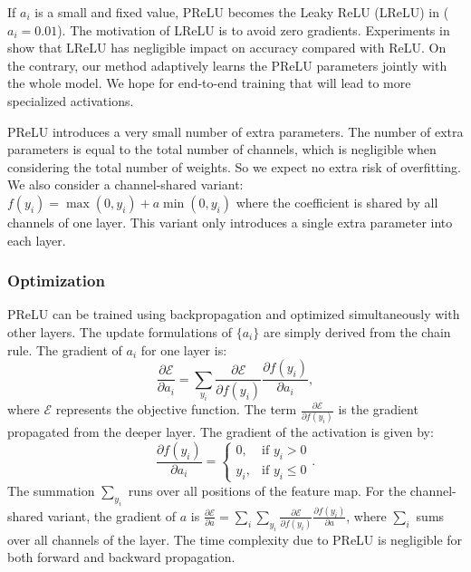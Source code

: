 \documentclass[10pt,twocolumn,letterpaper]{article}
\begin{document}
If $a_i$ is a small and fixed value, PReLU becomes the Leaky ReLU (LReLU) in \cite{Maas2013} ($a_i=0.01$). The motivation of LReLU is to avoid zero gradients. Experiments in \cite{Maas2013} show that LReLU has negligible impact on accuracy compared with ReLU. On the contrary, our method adaptively learns the PReLU parameters jointly with the whole model. We hope for end-to-end training that will lead to more specialized activations.

PReLU introduces a very small number of extra parameters. The number of extra parameters is equal to the total number of channels, which is negligible when considering the total number of weights. So we expect no extra risk of overfitting. We also consider a channel-shared variant: $f(y_i) = \max(0, y_i) + a \min(0, y_i)$ where the coefficient is shared by all channels of one layer. This variant only introduces a single extra parameter into each layer.

\subsubsection*{Optimization}

PReLU can be trained using backpropagation \cite{LeCun1989} and optimized simultaneously with other layers.
The update formulations of $\{a_i\}$ are simply derived from the chain rule. The gradient of $a_i$ for one layer is:
\begin{equation}\label{eq:grad}
\frac{\partial \mathcal{E}}{\partial a_i} = \sum_{y_i} \frac{\partial \mathcal{E}}{\partial f(y_i)}\frac{\partial f(y_i)}{\partial a_i},
\end{equation}
where $\mathcal{E}$ represents the objective function. The term $\frac{\partial \mathcal{E}}{\partial f(y_i)}$ is the gradient propagated from the deeper layer.
The gradient of the activation is given by:
\begin{equation}
\frac{\partial f(y_i)}{\partial a_i} = \begin{cases} 0, & \mbox{if } y_i > 0 \\ y_i, & \mbox{if } y_i \leq 0 \end{cases}.
\end{equation}
The summation $\sum_{y_i}$ runs over all positions of the feature map. For the channel-shared variant, the gradient of $a$ is $\frac{\partial \mathcal{E}}{\partial a} = \sum_i\sum_{y_i} \frac{\partial \mathcal{E}}{\partial f(y_i)}\frac{\partial f(y_i)}{\partial a}$, where $\sum_i$ sums over all channels of the layer. The time complexity due to PReLU is negligible for both forward and backward propagation.
\end{document}
